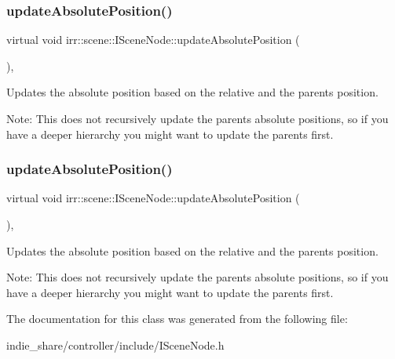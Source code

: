 \mbox{\label{classirr_1_1scene_1_1ISceneNode_aeb6e0dc034bb2101600ce87acbcf0f6e}} 
\subsubsection{\texorpdfstring{update\+Absolute\+Position()}{updateAbsolutePosition()}\hspace{0.1cm}{\footnotesize\ttfamily [1/2]}}
{\footnotesize\ttfamily virtual void irr\+::scene\+::\+I\+Scene\+Node\+::update\+Absolute\+Position (\begin{DoxyParamCaption}{ }\end{DoxyParamCaption})\hspace{0.3cm}{\ttfamily [inline]}, {\ttfamily [virtual]}}



Updates the absolute position based on the relative and the parents position. 

Note\+: This does not recursively update the parents absolute positions, so if you have a deeper hierarchy you might want to update the parents first. \mbox{\label{classirr_1_1scene_1_1ISceneNode_aeb6e0dc034bb2101600ce87acbcf0f6e}} 
\subsubsection{\texorpdfstring{update\+Absolute\+Position()}{updateAbsolutePosition()}\hspace{0.1cm}{\footnotesize\ttfamily [2/2]}}
{\footnotesize\ttfamily virtual void irr\+::scene\+::\+I\+Scene\+Node\+::update\+Absolute\+Position (\begin{DoxyParamCaption}{ }\end{DoxyParamCaption})\hspace{0.3cm}{\ttfamily [inline]}, {\ttfamily [virtual]}}



Updates the absolute position based on the relative and the parents position. 

Note\+: This does not recursively update the parents absolute positions, so if you have a deeper hierarchy you might want to update the parents first. 

The documentation for this class was generated from the following file\+:\begin{DoxyCompactItemize}
\item 
indie\+\_\+share/controller/include/I\+Scene\+Node.\+h\end{DoxyCompactItemize}
